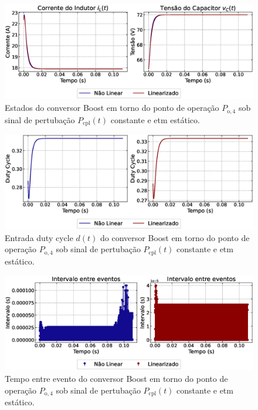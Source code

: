 \begin{figure}[H]
  \centering
  \captionsetup{justification=centering}
  \includegraphics[width=1.\textwidth]{figuras/static-etm/boost/sim1/op2/result.eps}
  \caption{Estados do conversor Boost em torno do ponto de operação $P_{\mathrm{o}, 4}$ sob sinal de pertubação $P_{\mathrm{cpl}}(t)$ constante e \acrshort{etm} estático.}
\end{figure}

\begin{figure}[H]
  \centering
  \captionsetup{justification=centering}
  \includegraphics[width=1.\textwidth]{figuras/static-etm/boost/sim1/op2/duty-cycle.eps}
  \caption{Entrada duty cycle $d(t)$ do conversor Boost em torno do ponto de operação $P_{\mathrm{o}, 4}$ sob sinal de pertubação $P_{\mathrm{cpl}}(t)$ constante e \acrshort{etm} estático.}
\end{figure}

\begin{figure}[H]
  \centering
  \captionsetup{justification=centering}
  \includegraphics[width=1.\textwidth]{figuras/static-etm/boost/sim1/op2/inter-event-times.eps}
  \caption{Tempo entre evento do conversor Boost em torno do ponto de operação $P_{\mathrm{o}, 4}$ sob sinal de pertubação $P_{\mathrm{cpl}}(t)$ constante e \acrshort{etm} estático.}
\end{figure}

